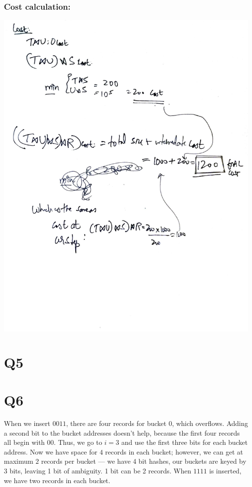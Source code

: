 \documentclass{article}
\begin{document}
\subsubsection{Cost calculation:}
\includegraphics[width=\textwidth]{db-q4-2.pdf}
\section{Q5}

\section{Q6}

When we insert $0011$, there are four records for bucket 0, which overflows.
Adding a second bit to the bucket addresses doesn't help, because the first
four records all begin with $00$. Thus, we go to $i = 3$ and use the first three
bits for each bucket address. Now we have space for $4$ records in each bucket;
however, we can get at maximum $2$ records per bucket --- we have 4 bit hashes,
our buckets are keyed by 3 bits, leaving 1 bit of ambiguity. 1 bit 
can be 2 records. When $1111$ is inserted, we have two records in each bucket.
\end{document}
